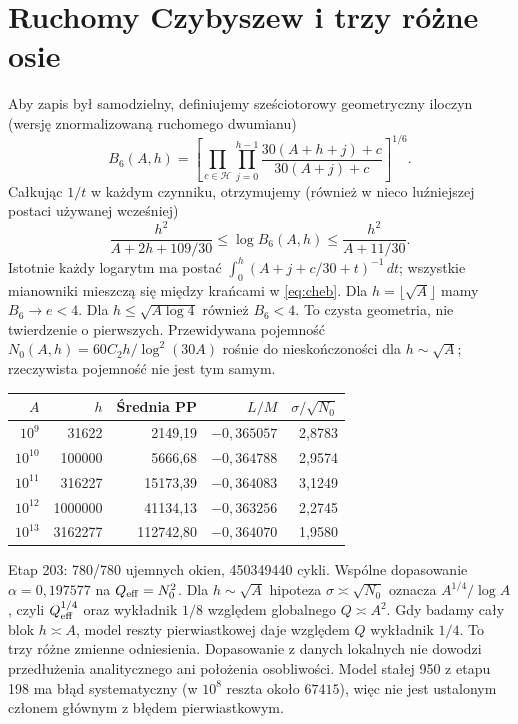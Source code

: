 \documentclass[11pt,a4paper]{article}
\theoremstyle{definition}\newtheorem{defn}[tw]{Definicja}
\theoremstyle{remark}\newtheorem*{uw}{Uwaga}
\newcommand{\HH}{\mathcal H}
\begin{document}
\section{Ruchomy Czybyszew i trzy różne osie}
Aby zapis był samodzielny, definiujemy sześciotorowy geometryczny iloczyn
(wersję znormalizowaną ruchomego dwumianu)
\[
 B_6(A,h)=\left[\prod_{c\in\HH}\prod_{j=0}^{h-1}
 \frac{30(A+h+j)+c}{30(A+j)+c}\right]^{1/6}.
\]
Całkując $1/t$ w każdym czynniku, otrzymujemy (również w nieco luźniejszej
postaci używanej wcześniej)
\begin{equation}\label{eq:cheb}
 \frac{h^2}{A+2h+109/30}\le\log B_6(A,h)\le\frac{h^2}{A+11/30}.
\end{equation}
Istotnie każdy logarytm ma postać $\int_0^h (A+j+c/30+t)^{-1}\,dt$;
wszystkie mianowniki mieszczą się między krańcami w \eqref{eq:cheb}.
Dla $h=\lfloor\sqrt A\rfloor$ mamy $B_6\to e<4$. Dla $h\le\sqrt{A\log4}$
również $B_6<4$. To czysta geometria, nie twierdzenie o pierwszych.
Przewidywana pojemność
$N_0(A,h)=60C_2 h/\log^2(30A)$ rośnie do nieskończoności dla
$h\sim\sqrt A$; rzeczywista pojemność nie jest tym samym.
\begin{center}
\begin{tabular}{rrrrr}
\toprule $A$&$h$&Średnia PP&$L/M$&$\sigma/\sqrt{N_0}$\\\midrule
$10^9$&31622&2149,19&$-0{,}365057$&2,8783\\
$10^{10}$&100000&5666,68&$-0{,}364788$&2,9574\\
$10^{11}$&316227&15173,39&$-0{,}364083$&3,1249\\
$10^{12}$&1000000&41134,13&$-0{,}363256$&2,2745\\
$10^{13}$&3162277&112742,80&$-0{,}364070$&1,9580\\\bottomrule
\end{tabular}
\end{center}
Etap 203: 780/780 ujemnych okien, 450349440 cykli. Wspólne dopasowanie
$\alpha=0{,}197577$ na $Q_{\rm eff}=N_0^2$. Dla $h\sim\sqrt A$ hipoteza
$\sigma\asymp\sqrt{N_0}$ oznacza $A^{1/4}/\log A$, czyli $Q_{\rm eff}^{1/4}$
oraz wykładnik $1/8$ względem globalnego $Q\asymp A^2$. Gdy badamy cały blok
$h\asymp A$, model reszty pierwiastkowej daje względem $Q$ wykładnik $1/4$.
To trzy różne zmienne odniesienia. Dopasowanie z danych lokalnych nie dowodzi
przedłużenia analitycznego ani położenia osobliwości. Model stałej 950 z
etapu 198 ma błąd systematyczny (w $10^8$ reszta około $67415$), więc nie
jest ustalonym członem głównym z błędem pierwiastkowym.
\end{document}
